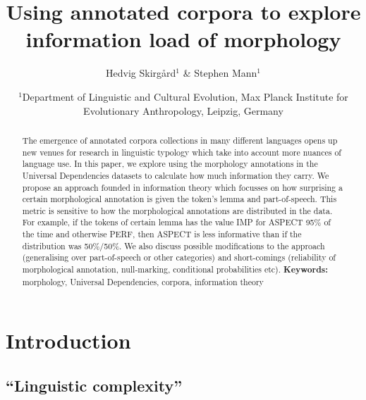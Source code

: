 \documentclass[a4paper]{article}
\title{Using annotated corpora to explore information load of morphology}
\author{Hedvig Skirgård$^1$ \& Stephen Mann$^1$}
\date{
	$^1$Department of Linguistic and Cultural Evolution, Max Planck Institute for Evolutionary Anthropology, Leipzig, Germany\\%
}
\begin{document}
	\maketitle
	
	\begin{abstract}
    The emergence of annotated corpora collections in many different languages opens up new venues for research in linguistic typology which take into account more nuances of language use. In this paper, we explore using the morphology annotations in the Universal Dependencies datasets to calculate how much information they carry. We propose an approach founded in information theory which focusses on how surprising a certain morphological annotation is given the token's lemma and part-of-speech. This metric is sensitive to how the morphological annotations are distributed in the data. For example, if the tokens of certain lemma has the value IMP for ASPECT 95\% of the time and otherwise PERF, then ASPECT is less informative than if the distribution was 50\%/50\%. We also discuss possible modifications to the approach (generalising over part-of-speech or other categories) and short-comings (reliability of morphological annotation, null-marking, conditional probabilities etc). 
		\noindent\textbf{Keywords:} morphology, Universal Dependencies, corpora, information theory
	\end{abstract}


\section{Introduction}
\subsection{``Linguistic complexity''}


\citet{ccoltekin2023complexity}




	
\end{document}
